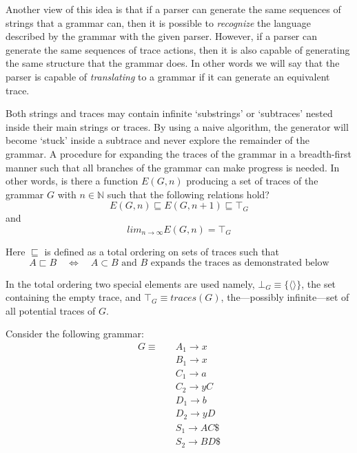 \documentclass[envcountsame,runningheads]{llncs}
\begin{document}
Another view of this idea is that if a parser can generate the same sequences of strings that a grammar can, then it is possible to \emph{recognize} the language described by the grammar with the given parser.
However, if a parser can generate the same sequences of trace actions, then it is also capable of generating the same structure that the grammar does.
In other words we will say that the parser is capable of \emph{translating} to a grammar if it can generate an equivalent trace.

Both strings and traces may contain infinite `substrings' or `subtraces' nested inside their main strings or traces.
By using a naive algorithm, the generator will become `stuck' inside a subtrace and never explore the remainder of the grammar.
A procedure for expanding the traces of the grammar in a breadth-first manner such that all branches of the grammar can make progress is needed.
In other words, is there a function $E(G, n)$ producing a set of traces of the grammar $G$ with $n \in \mathbb{N}$ such that the following relations hold?
\begin{equation} E(G, n) \sqsubseteq E(G, n+1) \sqsubseteq \top_{G} \end{equation}
and 
\begin{equation} lim_{n \to \infty} E(G,n) = \top_{G} \end{equation}

Here $\sqsubseteq$ is defined as a total ordering on sets of traces such that 
\begin{equation} A \sqsubset B \quad \Longleftrightarrow \quad A \subset B \text{ and $B$ expands the traces as demonstrated below} \end{equation}

In the total ordering two special elements are used namely, $\bot_{G} \equiv \{ \langle \rangle \}$, the set containing the empty trace, and $\top_{G} \equiv traces(G)$, the---possibly infinite---set of all potential traces of $G$.

Consider the following grammar:
\begin{align*}
G \equiv \quad & A_1 \rightarrow x\\
               & B_1 \rightarrow x\\
               & C_1 \rightarrow a\\
               & C_2 \rightarrow y C\\
               & D_1 \rightarrow b\\
               & D_2 \rightarrow y D\\
               & S_1 \rightarrow A C \$\\
               & S_2 \rightarrow B D \$
\end{align*}
\end{document}
